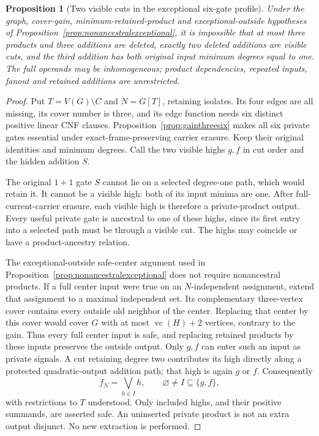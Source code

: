 \documentclass[11pt]{article}
\newcommand{\vc}{\operatorname{vc}}
\newtheorem{proposition}[theorem]{Proposition}
\theoremstyle{definition}
\theoremstyle{remark}
\begin{document}
\begin{proposition}[Two visible cuts in the exceptional six-gate profile]\label{prop:twovisibleexceptional}
Under the graph, cover-gain, minimum-retained-product and exceptional-outside
hypotheses of Proposition~\ref{prop:nonancestralexceptional}, it is impossible
that at most three products and three additions are deleted, exactly two
deleted additions are visible cuts, and the third addition has both original
input minimum degrees equal to one. The full operands may be inhomogeneous;
product dependencies, repeated inputs, fanout and retained additions are
unrestricted.
\end{proposition}
\begin{proof}
Put $T=V(G)\setminus C$ and $N=G[T]$, retaining isolates. Its four edges
are all missing, its cover number is three, and its edge function needs six
distinct positive linear CNF clauses. Proposition~\ref{prop:gainthreesix}
makes all six private gates essential under exact-frame-preserving carrier
erasure. Keep their original identities and minimum degrees. Call the two
visible highs $g,f$ in cut order and the hidden addition $S$.

The original $1+1$ gate $S$ cannot lie on a selected degree-one path, which
would retain it. It cannot be a visible high: both of its input minima are
one. After full-current-carrier erasure, each visible high is therefore a
private-product output. Every useful private gate is ancestral to one of
these highs, since its first entry into a selected path must be through a
visible cut. The highs may coincide or have a product-ancestry relation.

The exceptional-outside safe-center argument used in
Proposition~\ref{prop:nonancestralexceptional} does not require nonancestral
products. If a full center input were true on an $N$-independent assignment,
extend that assignment to a maximal independent set. Its complementary
three-vertex cover contains every outside old neighbor of the center.
Replacing that center by this cover would cover $G$ with at most
$\vc(H)+2$ vertices, contrary to the gain. Thus every full center input is
safe, and replacing retained products by these inputs preserves the outside
output. Only $g,f$ can enter such an input as private signals. A cut retaining
degree two contributes its high directly along a protected quadratic-output
addition path; that high is again $g$ or $f$. Consequently
\[
 f_N=\bigvee_{h\in I}h,\qquad\varnothing\ne I\subseteq\{g,f\},       \tag{*}
\]
with restrictions to $T$ understood. Only included highs, and their positive
summands, are asserted safe. An uninserted private product is not an extra
output disjunct. No new extraction is performed.


\end{proof}
\end{document}

